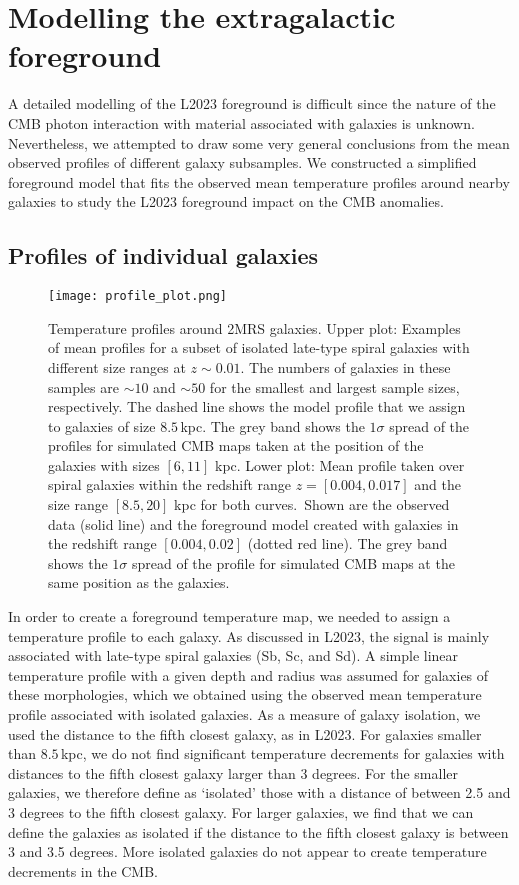 \documentclass{aa}
\begin{document}
\section{Modelling the extragalactic foreground}

A detailed modelling of the L2023 foreground is difficult since the nature of the CMB photon interaction with material associated with galaxies is unknown. Nevertheless, we attempted to draw some very general conclusions from the mean observed profiles of different galaxy subsamples. We constructed a simplified foreground model that fits the observed mean temperature profiles around nearby galaxies to study the L2023 foreground impact on the CMB anomalies.

\subsection{Profiles of individual galaxies}

\begin{figure}[htbp]
  \centering
  \texttt{[image: profile\_plot.png]}
     \caption{Temperature profiles around 2MRS galaxies. Upper plot: Examples of mean profiles for a subset of isolated late-type spiral galaxies with different size ranges at $z\sim0.01$. The numbers of galaxies in these samples are $\sim 10$ and $\sim 50$ for the smallest and largest sample sizes, respectively. The dashed line shows the model profile that we assign to galaxies of size $8.5$\,kpc. The grey band shows the $1\sigma$ spread of the profiles for simulated CMB maps taken at the position of the galaxies with sizes $[6,11]$\; kpc. Lower plot: Mean profile taken over spiral galaxies within the redshift range $z=[0.004,0.017]$ and the size range $[8.5, 20]$\; kpc for both curves.\ Shown are the observed data (solid line) and the foreground model created with galaxies in the redshift range $[0.004, 0.02]$ (dotted red line). The grey band shows the $1\sigma$ spread of the profile for simulated CMB maps at the same position as the galaxies. }
     \label{fig:profiles}
\end{figure}


In order to create a foreground temperature map, we needed to assign a temperature profile to each galaxy. As discussed in L2023, the signal is mainly associated with late-type spiral galaxies (Sb, Sc, and Sd). A simple linear temperature profile with a given depth and radius was assumed for galaxies of these morphologies, which we obtained using the observed mean temperature profile associated with isolated galaxies. As a measure of galaxy isolation, we used the distance to the fifth closest galaxy, as in L2023. For galaxies smaller than $8.5$\,kpc, we do not find significant temperature decrements for galaxies with distances to the fifth closest galaxy larger than 3 degrees. For the smaller galaxies, we therefore define as `isolated'  those with a distance of between 2.5 and 3 degrees to the fifth closest galaxy. For larger galaxies, we find that we can define the galaxies as isolated if the distance to the fifth closest galaxy is between 3 and 3.5 degrees. More isolated galaxies do not appear to create temperature decrements in the CMB.
\end{document}
